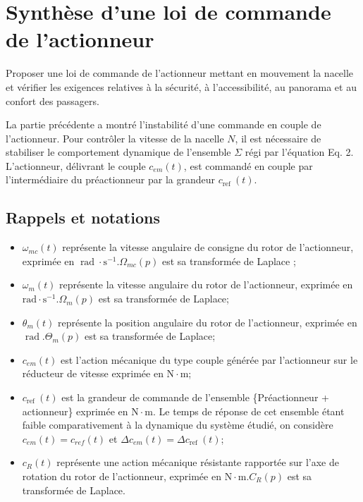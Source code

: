 \section{Synthèse d'une loi de commande de l'actionneur}

\begin{obj}
Proposer une loi de commande de l'actionneur mettant en mouvement la nacelle et vérifier les exigences relatives à la sécurité, à l'accessibilité, au panorama et au confort des passagers.
\end{obj}

La partie précédente a montré l'instabilité d'une commande en couple de l'actionneur. Pour contrôler la vitesse de la nacelle $N$, il est nécessaire de stabiliser le comportement dynamique de l'ensemble $\Sigma$ régi par l'équation Eq. 2. L'actionneur, délivrant le couple $c_{e m}(t)$, est commandé en couple par l'intermédiaire du préactionneur par la grandeur $c_{\text {ref }}(t)$.

\subsection*{Rappels et notations}
\begin{itemize}
  \item $\omega_{m c}(t)$ représente la vitesse angulaire de consigne du rotor de l'actionneur, exprimée en $\operatorname{rad} \cdot \mathrm{s}^{-1} . \Omega_{m c}(p)$ est sa transformée de Laplace ;
  \item $\omega_{m}(t)$ représente la vitesse angulaire du rotor de l'actionneur, exprimée en $\mathrm{rad} \cdot \mathrm{s}^{-1} . \Omega_{m}(p)$ est sa transformée de Laplace;
  \item $\theta_{m}(t)$ représente la position angulaire du rotor de l'actionneur, exprimée en $\operatorname{rad} . \Theta_{m}(p)$ est sa transformée de Laplace;
  \item $c_{e m}(t)$ est l'action mécanique du type couple générée par l'actionneur sur le réducteur de vitesse exprimée en $\mathrm{N} \cdot \mathrm{m}$;
  \item $c_{\text {ref }}(t)$ est la grandeur de commande de l'ensemble \{Préactionneur + actionneur\} exprimée en $\mathrm{N} \cdot \mathrm{m}$. Le temps de réponse de cet ensemble étant faible comparativement à la dynamique du système étudié, on considère $c_{e m}(t)=c_{r e f}(t)$ et $\Delta c_{e m}(t)=\Delta c_{\text {ref }}(t)$;
  \item $c_{R}(t)$ représente une action mécanique résistante rapportée sur l'axe de rotation du rotor de l'actionneur, exprimée en $\mathrm{N} \cdot \mathrm{m} . C_{R}(p)$ est sa transformée de Laplace.
\end{itemize}

